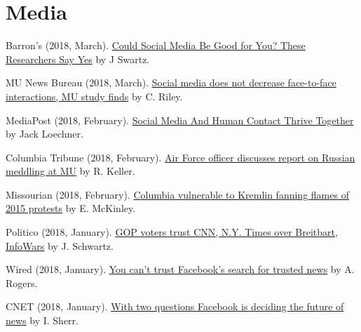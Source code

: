 \section{Media}
  \begin{bibenum}
    \item[] Barron's (2018, March).
    \href{https://www.barrons.com/articles/could-social-media-be-good-for-you-these-researchers-say-yes-1519932207}{Could Social Media Be Good for You? These Researchers Say Yes} by J Swartz.
    \item[] MU News Bureau (2018, March).
    \href{https://munews.missouri.edu/news-releases/2018/0301-social-media-does-not-decrease-face-to-face-interactions-mu-study-finds/}{Social media does not decrease face-to-face interactions, MU study finds} by C. Riley.
    \item[] MediaPost (2018, February).
    \href{https://mediapost.com/publications/article/315106/social-media-and-human-contact-thrive-together.html}{Social Media And Human Contact Thrive Together} by Jack Loechner.
    \item[] Columbia Tribune (2018, February).
    \href{http://www.columbiatribune.com/news/20180217/air-force-officer-discusses-report-on-russian-meddling-at-mu}{Air Force officer discusses report on Russian meddling at MU} by R. Keller.
    \item[] Missourian (2018, February).
    \href{https://www.columbiamissourian.com/news/higher_education/columbia-vulnerable-to-kremlin-fanning-flames-of-protests/article_929cf366-11ad-11e8-9631-63ac0b4a6fd3.html}{Columbia vulnerable to Kremlin fanning flames of 2015 protests} by E. McKinley.
    \item[] Politico (2018, January).
    \href{https://www.politico.com/amp/story/2018/02/06/gop-republican-voters-media-bias-trusted-sites-393650}{ GOP voters trust CNN, N.Y. Times over Breitbart, InfoWars} by J. Schwartz.
    \item[] Wired (2018, January).
    \href{https://www.wired.com/story/you-cant-trust-facebooks-search-for-trusted-news/}{You
    can't trust Facebook's search for trusted news} by A. Rogers.
    \item[] CNET (2018, January).
    \href{https://www.cnet.com/news/with-two-questions-facebook-is-deciding-the-future-of-news-zuckerberg-fake-news/}{With
    two questions Facebook is deciding the future of news} by I. Sherr.
  \end{bibenum}
